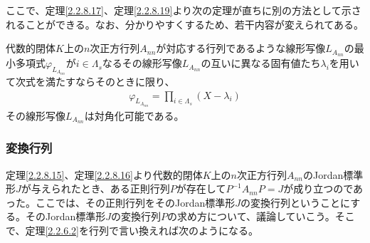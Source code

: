 \documentclass[dvipdfmx]{jsarticle}
\begin{document}
ここで、定理\ref{2.2.8.17}、定理\ref{2.2.8.19}より次の定理が直ちに別の方法として示されることができる。なお、分かりやすくするため、若干内容が変えられてある。
\begin{thm*}
代数的閉体$K$上の$n$次正方行列$A_{nn}$が対応する行列であるような線形写像$L_{A_{nn}}$の最小多項式$\varphi_{L_{A_{nn}}}$が$i \in \varLambda_{s}$なるその線形写像$L_{A_{nn}}$の互いに異なる固有値たち$\lambda_{i}$を用いて次式を満たすならそのときに限り、
\begin{align*}
\varphi_{L_{A_{nn}}} = \prod_{i \in \varLambda_{s}} \left( X - \lambda_{i} \right)
\end{align*}
その線形写像$L_{A_{nn}}$は対角化可能である。
\end{thm*}
\subsubsection{変換行列}%
定理\ref{2.2.8.15}、定理\ref{2.2.8.16}より代数的閉体$K$上の$n$次正方行列$A_{nn}$のJordan標準形$J$が与えられたとき、ある正則行列$P$が存在して$P^{- 1}A_{nn}P = J$が成り立つのであった。ここでは、その正則行列をそのJordan標準形$J$の変換行列ということにする。そのJordan標準形$J$の変換行列$P$の求め方について、議論していこう。そこで、定理\ref{2.2.6.2}を行列で言い換えれば次のようになる。
\end{document}
